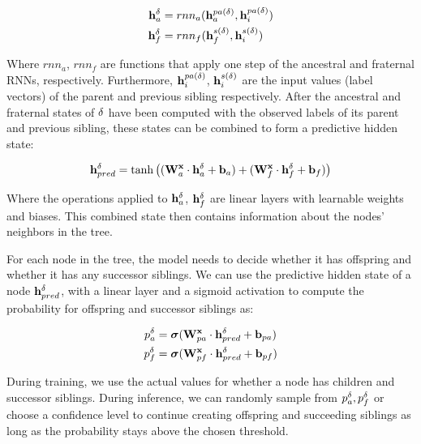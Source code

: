 \begin{align}
    \mathbf{h}_a^\delta &= rnn_a(\mathbf{h}_a^{pa(\delta)}, \mathbf{h}_i^{pa(\delta)}) \\ \label{eq:ancestral_update}
    \mathbf{h}_f^\delta &= rnn_f(\mathbf{h}_f^{s(\delta)}, \mathbf{h}_i^{s(\delta)}) 
\end{align}

Where $rnn_a$, $rnn_f$ are functions that apply one step of the ancestral and fraternal RNNs, respectively. Furthermore, $\mathbf{h}_i^{pa(\delta)}$, $\mathbf{h}_i^{s(\delta)}$ are the input values (label vectors) of the parent and previous sibling respectively. After the ancestral and fraternal states of $\delta$ have been computed with the observed labels of its parent and previous sibling, these states can be combined to form a predictive hidden state:

\begin{align}
    \mathbf{h}^\delta_{pred} = \tanh\left((\mathbf{W}^{\mathbf{x}}_a \cdot \mathbf{h}_a^\delta + \mathbf{b}_a) + (\mathbf{W}^{\mathbf{x}}_f \cdot \mathbf{h}_f^\delta + \mathbf{b}_f)\right)
\end{align}

Where the operations applied to $\mathbf{h}_a^\delta$, $\mathbf{h}_f^\delta$ are linear layers with learnable weights and biases. This combined state then contains information about the nodes' neighbors in the tree.



For each node in the tree, the model needs to decide whether it has offspring and whether it has any successor siblings. We can use the predictive hidden state of a node $\mathbf{h}^\delta_{pred}$, with a linear layer and a sigmoid activation to compute the probability for offspring and successor siblings as:

\begin{align}
    p_a^\delta &= \boldsymbol\sigma(\mathbf{W}^{\mathbf{x}}_{pa} \cdot \mathbf{h}_{pred}^\delta + \mathbf{b}_{pa}) \label{eq:prob_ancestral} \\
    p_f^\delta &= \boldsymbol\sigma(\mathbf{W}^{\mathbf{x}}_{pf} \cdot \mathbf{h}_{pred}^\delta + \mathbf{b}_{pf})\label{eq:prob_fraternal}
\end{align}

During training, we use the actual values for whether a node has children and successor siblings. 
During inference, we can randomly sample from $p_a^\delta,p_f^\delta$ or choose a confidence level to continue creating offspring and succeeding siblings as long as the probability stays above the chosen threshold. 

